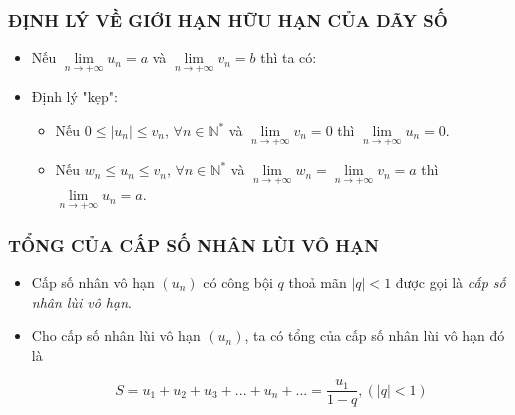 \subsubsection{ĐỊNH LÝ VỀ GIỚI HẠN HỮU HẠN CỦA DÃY SỐ}
\begin{itemize}
	\item [\iconMT] Nếu $\lim\limits_{n \to +\infty}u_n=a$ và $\lim\limits_{n \to +\infty}v_n=b$ thì ta có:
	\begin{khung}
		\begin{itemize}
		\end{itemize}
	\end{khung}
	\item [\iconMT] Định lý "kẹp":
	\begin{khung}
		\begin{itemize}
			\item Nếu $0\le \left|u_n\right|\le v_n$, $\forall n\in \mathbb{N}^*$ và $\lim\limits_{n \to +\infty}v_n=0$ thì $\lim\limits_{n \to +\infty}u_n=0$.
			\item Nếu $w_n\le u_n\le v_n$, $\forall n\in \mathbb{N}^*$ và $\lim\limits_{n \to +\infty}w_n=\lim\limits_{n \to +\infty}v_n=a$ thì $\lim\limits_{n \to +\infty}u_n=a$.
		\end{itemize}
	\end{khung}
\end{itemize}

\subsubsection{TỔNG CỦA CẤP SỐ NHÂN LÙI VÔ HẠN}
\begin{itemize}
	\item [\iconMT] Cấp số nhân vô hạn $(u_n)$ có công bội $q$ thoả mãn $|q|<1$ được gọi là \textit{cấp số nhân lùi vô hạn}.
	\item [\iconMT] Cho cấp số nhân lùi vô hạn $(u_n)$, ta có tổng của cấp số nhân lùi vô hạn đó là 
	\begin{khung}
		$$S=u_1+u_2+u_3+...+u_n+...=\dfrac{u_1}{1-q}, (|q|<1)$$
	\end{khung}
\end{itemize}

